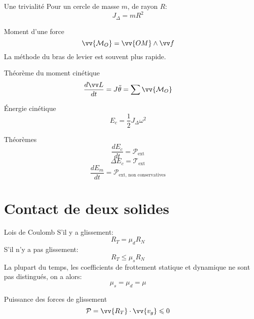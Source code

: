 \documentclass[french, a4paper, 11pt, twocolumn]{article}
\begin{document}
\begin{cadre}{Une trivialité}
  Pour un cercle de masse \(m\), de rayon \(R\):
  \[J_{\Delta} = mR^{2}\]
\end{cadre}

\begin{cadre}{Moment d'une force}
  \[\vv{\mathcal M_{O}} = \vv{OM}\wedge \vv f\]
  La méthode du bras de levier est souvent plus rapide.
\end{cadre}

\begin{cadre}{Théorème du moment cinétique}
  \[\dfrac{d\vv L}{dt}=J\ddot\theta=\sum\vv{\mathcal M_{O}}\]
\end{cadre}

\begin{cadre}{Énergie cinétique}
  \[E_{c} = \dfrac{1}{2}J_{\Delta}\omega^{2}\]
\end{cadre}

\begin{cadre}{Théorèmes}
  \[\dfrac{dE_{c}}{dt}=\mathcal P_{\mathrm{ext}}\]
  \[\Delta E_{c}=\mathcal T_{\mathrm{ext}}\]
  \[\dfrac{dE_{m}}{dt}=\mathcal P_{\text{ext, non conservatives}}\]
\end{cadre}

\section{Contact de deux solides}
\begin{cadre}{Lois de Coulomb}
  S'il y a glissement:
  \[R_{T} = \mu_{d}R_{N}\]
  S'il n'y a pas glissement:
  \[R_{T} \leqslant \mu_{s}R_{N}\]
  La plupart du temps, les coefficients de frottement statique et dynamique ne sont pas distingués, on a alors:
  \[\mu_{s} = \mu_{d} = \mu\]
\end{cadre}

\begin{cadre}{Puissance des forces de glissement}
  \[\mathcal P = \vv{R_{T}}\cdot\vv{v_{g}}\leqslant 0\]
\end{cadre}
\end{document}

